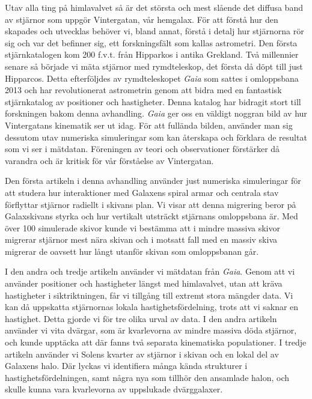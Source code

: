 
Utav alla ting på himlavalvet så är det största och mest slående det diffusa band av stjärnor som uppgör Vintergatan, vår hemgalax. För att förstå hur den skapades och utvecklas behöver vi, bland annat, förstå i detalj hur stjärnorna rör sig och var det befinner sig, ett forskningsfält som kallas astrometri. Den första stjärnkatalogen kom 200 f.v.t. från Hipparkos i antika Grekland. Två millennier senare så började vi mäta stjärnor med rymdteleskop, det första då döpt till just Hipparcos. Detta efterföljdes av rymdteleskopet \textit{Gaia} som sattes i omloppsbana 2013 och har revolutionerat astrometrin genom att bidra med en fantastisk stjärnkatalog av positioner och hastigheter. Denna katalog har bidragit stort till forskningen bakom denna avhandling. \textit{Gaia} ger oss en väldigt noggran bild av hur Vintergatans kinematik ser ut idag. För att fullända bilden, använder man sig dessutom utav numeriska simuleringar som kan återskapa och förklara de resultat som vi ser i mätdatan. Föreningen av teori och observationer förstärker då varandra och är kritisk för vår förståelse av Vintergatan. 

Den första artikeln i denna avhandling använder just numeriska simuleringar för att studera hur interaktioner med Galaxens spiral armar och centrala stav förflyttar stjärnor radiellt i skivans plan. Vi visar att denna migrering beror på Galaxskivans styrka och hur vertikalt utsträckt stjärnans omloppsbana är. Med över 100 simulerade skivor kunde vi bestämma att i mindre massiva skivor migrerar stjärnor mest nära skivan och i motsatt fall med en massiv skiva migrerar de oavsett hur långt utanför skivan som omloppsbanan går. 

I den andra och tredje artikeln använder vi mätdatan från \textit{Gaia}. Genom att vi använder positioner och hastigheter längst med himlavalvet, utan att kräva hastigheter i siktriktningen, får vi tillgång till extremt stora mängder data. Vi kan då uppskatta stjärnornas lokala hastighetsfördelning, trots att vi saknar en hastighet. Detta gjorde vi för tre olika urval av data. I den andra artikeln använder vi vita dvärgar, som är kvarlevorna av mindre massiva döda stjärnor, och kunde upptäcka att där fanns två separata kinematiska populationer. I tredje artikeln använder vi Solens kvarter av stjärnor i skivan och en lokal del av Galaxens halo. Där lyckas vi identifiera många kända strukturer i hastighetsfördelningen, samt några nya som tillhör den ansamlade halon, och skulle kunna vara kvarlevorna av uppslukade dvärggalaxer. 

